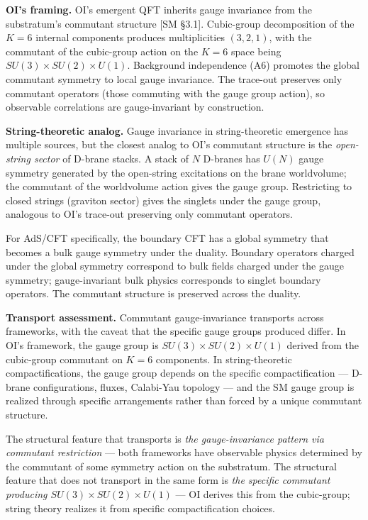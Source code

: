 \documentclass[
]{article}
\begin{document}
\textbf{OI's framing.} OI's emergent QFT inherits gauge invariance from
the substratum's commutant structure {[}SM §3.1{]}. Cubic-group
decomposition of the \(K = 6\) internal components produces
multiplicities \((3, 2, 1)\), with the commutant of the cubic-group
action on the \(K = 6\) space being \(SU(3) \times SU(2) \times U(1)\).
Background independence (A6) promotes the global commutant symmetry to
local gauge invariance. The trace-out preserves only commutant operators
(those commuting with the gauge group action), so observable
correlations are gauge-invariant by construction.

\textbf{String-theoretic analog.} Gauge invariance in string-theoretic
emergence has multiple sources, but the closest analog to OI's commutant
structure is the \emph{open-string sector} of D-brane stacks. A stack of
\(N\) D-branes has \(U(N)\) gauge symmetry generated by the open-string
excitations on the brane worldvolume; the commutant of the worldvolume
action gives the gauge group. Restricting to closed strings (graviton
sector) gives the singlets under the gauge group, analogous to OI's
trace-out preserving only commutant operators.

For AdS/CFT specifically, the boundary CFT has a global symmetry that
becomes a bulk gauge symmetry under the duality. Boundary operators
charged under the global symmetry correspond to bulk fields charged
under the gauge symmetry; gauge-invariant bulk physics corresponds to
singlet boundary operators. The commutant structure is preserved across
the duality.

\textbf{Transport assessment.} Commutant gauge-invariance transports
across frameworks, with the caveat that the specific gauge groups
produced differ. In OI's framework, the gauge group is
\(SU(3) \times SU(2) \times U(1)\) derived from the cubic-group
commutant on \(K = 6\) components. In string-theoretic
compactifications, the gauge group depends on the specific
compactification --- D-brane configurations, fluxes, Calabi-Yau topology
--- and the SM gauge group is realized through specific arrangements
rather than forced by a unique commutant structure.

The structural feature that transports is \emph{the gauge-invariance
pattern via commutant restriction} --- both frameworks have observable
physics determined by the commutant of some symmetry action on the
substratum. The structural feature that does not transport in the same
form is \emph{the specific commutant producing
\(SU(3) \times SU(2) \times U(1)\)} --- OI derives this from the
cubic-group; string theory realizes it from specific compactification
choices.
\end{document}
